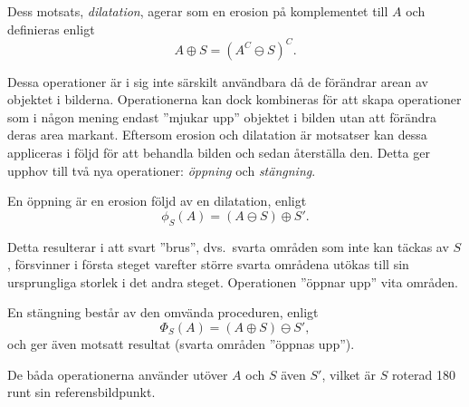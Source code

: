\documentclass[../rapport_MVEX01-11-05]{subfiles}
\begin{document}
Dess motsats, \emph{dilatation}, agerar som
en erosion på komplementet till $A$ och definieras enligt
\begin{equation*}
  A\oplus S = (A^C\ominus S)^C.
\end{equation*}

Dessa operationer är i sig inte särskilt användbara då de förändrar
arean av objektet i bilderna. Operationerna kan dock kombineras för
att skapa operationer som i någon mening endast 
''mjukar upp'' objektet i bilden utan att förändra deras area markant.
Eftersom erosion och dilatation är motsatser kan dessa appliceras i
följd för att behandla bilden och
sedan återställa den. Detta ger upphov till två nya operationer:
\emph{öppning} och \emph{stängning}.

En öppning är en erosion följd av en dilatation, enligt
\begin{equation*}
  \phi_S(A)=(A\ominus S)\oplus S'.
\end{equation*}

Detta resulterar i att svart ''brus'', dvs.~svarta områden som inte kan täckas
av $S$, försvinner i
första steget varefter större svarta områdena utökas till sin ursprungliga
storlek i det andra
steget. Operationen ''öppnar upp'' vita områden.

En stängning består av den omvända proceduren, enligt
\begin{equation*}
  \Phi_S(A)=(A\oplus S)\ominus S',
\end{equation*}
och ger även motsatt resultat (svarta områden ''öppnas upp'').

De
båda operationerna använder utöver $A$ och $S$ även $S'$, vilket är
$S$ roterad 180\textdegree{} runt sin referensbildpunkt.
\end{document}
